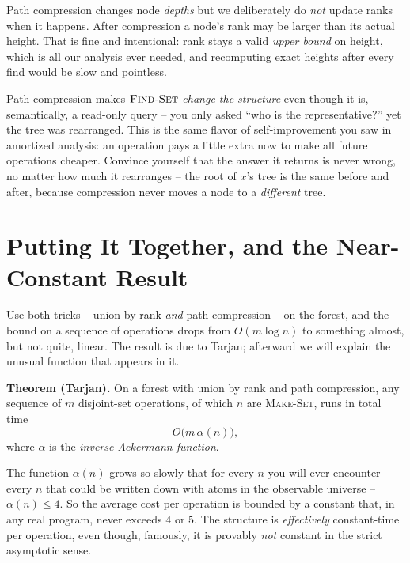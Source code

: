 \begin{trapbox}
Path compression changes node \emph{depths} but we deliberately do \emph{not}
update ranks when it happens. After compression a node's rank may be larger
than its actual height. That is fine and intentional: rank stays a valid
\emph{upper bound} on height, which is all our analysis ever needed, and
recomputing exact heights after every find would be slow and pointless.
\end{trapbox}

\begin{walkbox}
Path compression makes
$\textsc{Find-Set}$ \emph{change the structure} even though it is, semantically,
a read-only query -- you only asked ``who is the representative?'' yet the tree
was rearranged. This is the same flavor of self-improvement you saw in
amortized analysis: an operation pays a little extra now to make all future
operations cheaper. Convince yourself that the answer it returns is never
wrong, no matter how much it rearranges -- the root of $x$'s tree is the same
before and after, because compression never moves a node to a \emph{different}
tree.
\end{walkbox}

\section{Putting It Together, and the Near-Constant Result}
\label{ch19:together}

Use both tricks -- union by rank \emph{and} path compression -- on the forest,
and the bound on a sequence of operations drops from $O(m \log n)$ to something
almost, but not quite, linear. The result is due to Tarjan; afterward we will
explain the unusual function that appears in it.

\begin{formalbox}
\textbf{Theorem (Tarjan).} On a forest with union by rank and path
compression, any sequence of $m$ disjoint-set operations, of which $n$ are
\textsc{Make-Set}, runs in total time
\[
O\big(m \, \alpha(n)\big),
\]
where $\alpha$ is the \emph{inverse Ackermann function}.
\end{formalbox}

The function $\alpha(n)$ grows so slowly that for every $n$ you will ever
encounter -- every $n$ that could be written down with atoms in the observable
universe -- $\alpha(n) \le 4$. So the average cost per operation is bounded by a
constant that, in any real program, never exceeds $4$ or $5$. The structure is
\emph{effectively} constant-time per operation, even though, famously, it is
provably \emph{not} constant in the strict asymptotic sense.

